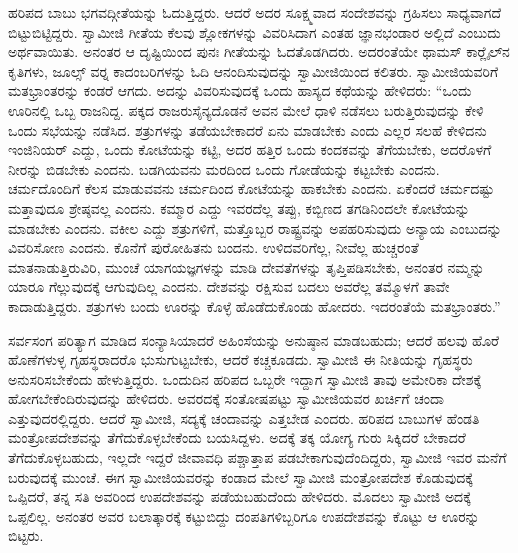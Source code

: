  ಹರಿಪದ ಬಾಬು ಭಗವದ್ಗೀತೆಯನ್ನು ಓದುತ್ತಿದ್ದರು. ಆದರೆ ಅದರ ಸೂಕ್ಷ್ಮವಾದ ಸಂದೇಶವನ್ನು ಗ್ರಹಿಸಲು ಸಾಧ್ಯವಾಗದೆ ಬಿಟ್ಟುಬಿಟ್ಟಿದ್ದರು. ಸ್ವಾಮೀಜಿ ಗೀತೆಯ ಕೆಲವು ಶ್ಲೋಕಗಳನ್ನು ವಿವರಿಸಿದಾಗ ಎಂತಹ ಜ್ಞಾನಭಂಡಾರ ಅಲ್ಲಿದೆ ಎಂಬುದು ಅರ್ಥವಾಯಿತು. ಅನಂತರ ಆ ದೃಷ್ಟಿಯಿಂದ ಪುನಃ ಗೀತೆಯನ್ನು ಓದತೊಡಗಿದರು. ಅದರಂತೆಯೇ ಥಾಮಸ್ ಕಾರ‍್ಲೈಲ್‍ನ ಕೃತಿಗಳು, ಜೂಲ್ಸ್ ‍ವರ‍್ನ ಕಾದಂಬರಿಗಳನ್ನು ಓದಿ ಆನಂದಿಸುವುದನ್ನು ಸ್ವಾಮೀಜಿಯಿಂದ ಕಲಿತರು. ಸ್ವಾಮೀಜಿಯವರಿಗೆ ಮತಭ್ರಾಂತರನ್ನು ಕಂಡರೆ ಆಗದು. ಅದನ್ನು ವಿವರಿಸುವುದಕ್ಕೆ ಒಂದು ಹಾಸ್ಯದ ಕಥೆಯನ್ನು ಹೇಳಿದರು: “ಒಂದು ಊರಿನಲ್ಲಿ ಒಬ್ಬ ರಾಜನಿದ್ದ. ಪಕ್ಕದ ರಾಜರು\break ಸೈನ್ಯದೊಡನೆ ಅವನ ಮೇಲೆ ಧಾಳಿ ನಡೆಸಲು ಬರುತ್ತಿರುವುದನ್ನು ಕೇಳಿ ಒಂದು ಸಭೆಯನ್ನು ನಡೆಸಿದ. ಶತ್ರುಗಳನ್ನು ತಡೆಯಬೇಕಾದರೆ ಏನು ಮಾಡಬೇಕು ಎಂದು ಎಲ್ಲರ ಸಲಹೆ ಕೇಳಿದನು ಇಂಜಿನಿಯರ್ ಎದ್ದು, ಒಂದು ಕೋಟೆಯನ್ನು ಕಟ್ಟಿ, ಅದರ ಹತ್ತಿರ ಒಂದು ಕಂದಕವನ್ನು ತೆಗೆಯಬೇಕು, ಅದರೊಳಗೆ ನೀರನ್ನು ಬಿಡಬೇಕು ಎಂದನು. ಬಡಗಿಯವನು ಮರದಿಂದ ಒಂದು ಗೋಡೆಯನ್ನು ಕಟ್ಟಬೇಕು ಎಂದನು. ಚರ್ಮದೊಂದಿಗೆ ಕೆಲಸ ಮಾಡುವವನು ಚರ್ಮದಿಂದ ಕೋಟೆಯನ್ನು ಹಾಕಬೇಕು ಎಂದನು. ಏಕೆಂದರೆ ಚರ್ಮದಷ್ಟು ಮತ್ತಾವುದೂ ಶ್ರೇಷ್ಠವಲ್ಲ ಎಂದನು. ಕಮ್ಮಾರ ಎದ್ದು ಇವರದೆಲ್ಲ ತಪ್ಪು, ಕಬ್ಬಿಣದ ತಗಡಿನಿಂದಲೇ ಕೋಟೆಯನ್ನು ಮಾಡಬೇಕು ಎಂದನು. ವಕೀಲ ಎದ್ದು ಶತ್ರುಗಳಿಗೆ, ಮತ್ತೊಬ್ಬರ ರಾಷ್ಟ್ರವನ್ನು ಅಪಹರಿಸುವುದು ಅನ್ಯಾಯ ಎಂಬುದನ್ನು ವಿವರಿಸೋಣ ಎಂದನು. ಕೊನೆಗೆ ಪುರೋಹಿತನು ಬಂದನು. ಉಳಿದವರಿಗೆಲ್ಲ, ನೀವೆಲ್ಲ ಹುಚ್ಚರಂತೆ ಮಾತನಾಡುತ್ತಿರುವಿರಿ, ಮುಂಚೆ ಯಾಗಯಜ್ಞಗಳನ್ನು ಮಾಡಿ ದೇವತೆಗಳನ್ನು ತೃಪ್ತಿಪಡಿಸಬೇಕು, ಅನಂತರ ನಮ್ಮನ್ನು ಯಾರೂ ಗೆಲ್ಲುವುದಕ್ಕೆ ಆಗುವುದಿಲ್ಲ ಎಂದನು. ದೇಶವನ್ನು ರಕ್ಷಿಸುವ ಬದಲು ಅವರೆಲ್ಲ ತಮ್ಮೊಳಗೆ ತಾವೇ ಕಾದಾಡುತ್ತಿದ್ದರು. ಶತ್ರುಗಳು ಬಂದು ಊರನ್ನು ಕೊಳ್ಳೆ ಹೊಡೆದುಕೊಂಡು ಹೋದರು. ಇದರಂತೆಯೆ ಮತಭ್ರಾಂತರು.” 

 ಸರ್ವಸಂಗ ಪರಿತ್ಯಾಗ ಮಾಡಿದ ಸಂನ್ಯಾಸಿಯಾದರೆ ಅಹಿಂಸೆಯನ್ನು ಅನುಷ್ಠಾನ ಮಾಡಬಹುದು; ಆದರೆ ಹಲವು ಹೊರೆ ಹೊಣೆಗಳುಳ್ಳ ಗೃಹಸ್ಥರಾದರೊ ಭುಸುಗುಟ್ಟಬೇಕು, ಆದರೆ ಕಚ್ಚಕೂಡದು. ಸ್ವಾಮೀಜಿ ಈ ನೀತಿಯನ್ನು ಗೃಹಸ್ಥರು ಅನುಸರಿಸಬೇಕೆಂದು ಹೇಳುತ್ತಿದ್ದರು. ಒಂದುದಿನ ಹರಿಪದ ಒಬ್ಬರೇ ಇದ್ದಾಗ ಸ್ವಾಮೀಜಿ ತಾವು ಅಮೇರಿಕಾ ದೇಶಕ್ಕೆ ಹೋಗಬೇಕೆಂದಿರುವುದನ್ನು ಹೇಳಿದರು. ಅವರದಕ್ಕೆ ಸಂತೋಷಪಟ್ಟು ಸ್ವಾಮೀಜಿಯವರ ಖರ್ಚಿಗೆ ಚಂದಾ ಎತ್ತುವುದರಲ್ಲಿದ್ದರು. ಆದರೆ ಸ್ವಾಮೀಜಿ, ಸದ್ಯಕ್ಕೆ ಚಂದಾವನ್ನು ಎತ್ತಬೇಡ ಎಂದರು. ಹರಿಪದ ಬಾಬುಗಳ ಹೆಂಡತಿ ಮಂತ್ರೋಪದೇಶವನ್ನು ತೆಗೆದುಕೊಳ್ಳಬೇಕೆಂದು ಬಯಸಿದ್ದಳು. ಅದಕ್ಕೆ ತಕ್ಕ ಯೋಗ್ಯ ಗುರು ಸಿಕ್ಕಿದರೆ ಬೇಕಾದರೆ ತೆಗೆದುಕೊಳ್ಳಬಹುದು, ಇಲ್ಲದೇ ಇದ್ದರೆ ಜೀವಾವಧಿ ಪಶ್ಚಾತ್ತಾಪ ಪಡಬೇಕಾಗುವುದೆಂದಿದ್ದರು, ಸ್ವಾಮೀಜಿ ಇವರ ಮನೆಗೆ ಬರುವುದಕ್ಕೆ ಮುಂಚೆ. ಈಗ ಸ್ವಾಮೀಜಿಯವರನ್ನು ಕಂಡಾದ ಮೇಲೆ ಸ್ವಾಮೀಜಿ ಮಂತ್ರೋಪದೇಶ ಕೊಡುವುದಕ್ಕೆ ಒಪ್ಪಿದರೆ, ತನ್ನ ಸತಿ ಅವರಿಂದ ಉಪದೇಶವನ್ನು ಪಡೆಯಬಹುದೆಂದು ಹೇಳಿದರು. ಮೊದಲು ಸ್ವಾಮೀಜಿ ಅದಕ್ಕೆ ಒಪ್ಪಲಿಲ್ಲ. ಅನಂತರ ಅವರ ಬಲಾತ್ಕಾರಕ್ಕೆ ಕಟ್ಟುಬಿದ್ದು ದಂಪತಿಗಳಿಬ್ಬರಿಗೂ ಉಪದೇಶವನ್ನು ಕೊಟ್ಟು ಆ ಊರನ್ನು ಬಿಟ್ಟರು. 


